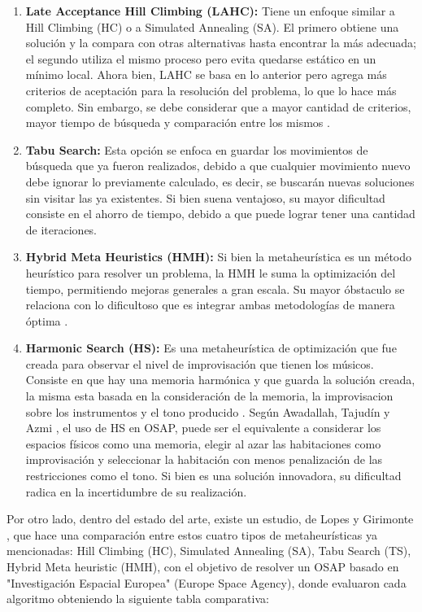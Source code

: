 \documentclass[letter, 10pt]{article}
\begin{document}
\begin{enumerate}
    \item \textbf{Late Acceptance Hill Climbing (LAHC):} Tiene un enfoque similar a Hill Climbing (HC) o a Simulated Annealing (SA). El primero obtiene una soluci\'on y la compara con otras alternativas hasta encontrar la m\'as adecuada; el segundo utiliza el mismo proceso pero evita quedarse est\'atico en un m\'inimo local. Ahora bien, LAHC se basa en lo anterior pero agrega m\'as criterios de aceptaci\'on para la resoluci\'on del problema, lo que lo hace m\'as completo. Sin embargo, se debe considerar que a mayor cantidad de criterios, mayor tiempo de b\'usqueda y comparaci\'on entre los mismos \cite{bolaji2019adaptation}.
    \item \textbf{Tabu Search:} Esta opci\'on se enfoca en guardar los movimientos de b\'usqueda que ya fueron realizados, debido a que cualquier movimiento nuevo debe ignorar lo previamente calculado, es decir, se buscar\'an nuevas soluciones sin visitar las ya existentes. Si bien suena ventajoso, su mayor dificultad consiste en el ahorro de tiempo, debido a que puede lograr tener una cantidad de iteraciones.
    \item \textbf{Hybrid Meta Heuristics (HMH):} Si bien la metaheur\'istica es un m\'etodo heur\'istico para resolver un problema, la HMH le suma la optimizaci\'on del tiempo, permitiendo mejoras generales a gran escala. Su mayor \'obstaculo se relaciona con lo dificultoso que es integrar ambas metodolog\'ias de manera \'optima \cite{blum2008hybrid}.
    \item \textbf{Harmonic Search (HS):} Es una metaheur\'istica de optimizaci\'on que fue creada para observar el nivel de improvisaci\'on que tienen los m\'usicos. Consiste en que hay una memoria harm\'onica y que guarda la soluci\'on creada, la misma esta basada en la consideraci\'on de la memoria, la improvisacion sobre los instrumentos y el tono producido \cite{Gao2015}. Seg\'un Awadallah, Tajud\'in y Azmi \cite{awadallah2012office}, el uso de HS en OSAP, puede ser el equivalente a considerar los espacios f\'isicos como una memoria, elegir al azar las habitaciones como improvisaci\'on y seleccionar la habitaci\'on con menos penalizaci\'on de las restricciones como el tono. Si bien es una soluci\'on innovadora, su dificultad radica en la incertidumbre de su realizaci\'on. 
\end{enumerate}
Por otro lado, dentro del estado del arte, existe un estudio, de Lopes y Girimonte \cite{lopes2010office}, que hace una comparaci\'on entre estos cuatro tipos de metaheur\'isticas ya mencionadas: Hill Climbing (HC), Simulated Annealing (SA), Tabu Search (TS), Hybrid Meta heuristic (HMH), con el objetivo de resolver un OSAP basado en "Investigaci\'on Espacial Europea" (Europe Space Agency), donde evaluaron cada algoritmo obteniendo la siguiente tabla comparativa:
\end{document}
